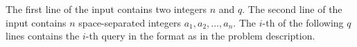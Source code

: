 The first line of the input contains two integers $n$ and $q$.
The second line of the input contains $n$ space-separated integers $a_1,a_2,\ldots,a_n$.
The $i$-th of the following $q$ lines contains the $i$-th query
in the format as in the problem description.